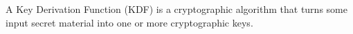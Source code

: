 \documentclass[a4paper, 12pt]{book} %
\begin{document}
A Key Derivation Function (KDF) is a cryptographic algorithm that turns some input secret material into one or more cryptographic keys.

    













\cite{adamson2012set}




\printbibliography
\printindex
\end{document}
